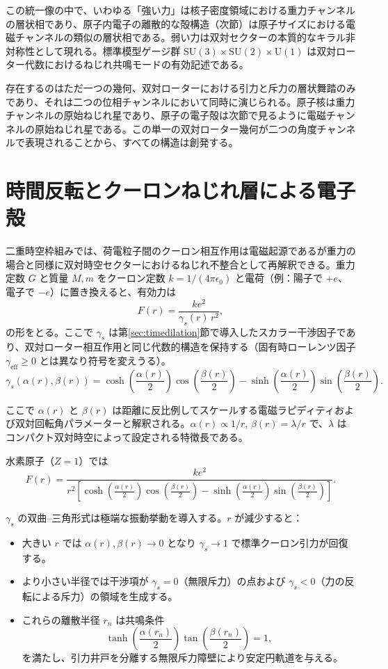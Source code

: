 \documentclass[dvipdfmx,a4paper]{article}
\begin{document}
この統一像の中で、いわゆる「強い力」は核子密度領域における重力チャンネルの層状相であり、原子内電子の離散的な殻構造（次節）は原子サイズにおける電磁チャンネルの類似の層状相である。弱い力は双対セクターの本質的なキラル非対称性として現れる。標準模型ゲージ群 $\mathrm{SU}(3)\times\mathrm{SU}(2)\times\mathrm{U}(1)$ は双対ローター代数におけるねじれ共鳴モードの有効記述である。

存在するのはただ一つの幾何、双対ローターにおける引力と斥力の層状舞踏のみであり、それは二つの位相チャンネルにおいて同時に演じられる。原子核は重力チャンネルの原始ねじれ星であり、原子の電子殻は次節で見るように電磁チャンネルの原始ねじれ星である。この単一の双対ローター幾何が二つの角度チャンネルで表現されることから、すべての構造は創発する。

\section{時間反転とクーロンねじれ層による電子殻}
\label{sec:electronshells}

二重時空枠組みでは、荷電粒子間のクーロン相互作用は電磁起源であるが重力の場合と同様に双対時空セクターにおけるねじれ不整合として再解釈できる。重力定数 $G$ と質量 $M,m$ をクーロン定数 $k = 1/(4\pi\epsilon_0)$ と電荷（例：陽子で $+e$、電子で $-e$）に置き換えると、有効力は
\[
F(r) = \frac{k e^2}{\gamma_s(r)\, r^2},
\]
の形をとる。ここで $\gamma_s$ は第\ref{sec:timedilation}節で導入したスカラー干渉因子であり、双対ローター相互作用と同じ代数的構造を保持する（固有時ローレンツ因子 $\gamma_\text{eff} \geq 0$ とは異なり符号を変えうる）。
\[
\gamma_s(\alpha(r),\beta(r)) = \cosh\!\left(\frac{\alpha(r)}{2}\right) \cos\!\left(\frac{\beta(r)}{2}\right) - \sinh\!\left(\frac{\alpha(r)}{2}\right) \sin\!\left(\frac{\beta(r)}{2}\right).
\]

ここで $\alpha(r)$ と $\beta(r)$ は距離に反比例してスケールする電磁ラピディティおよび双対回転角パラメーターと解釈される。$\alpha(r) \propto 1/r$, $\beta(r) = \lambda / r$ で、$\lambda$ はコンパクト双対時空によって設定される特徴長である。

水素原子（$Z=1$）では
\[
F(r) = \frac{k e^2}{r^2 \left[ \cosh\!\left(\frac{\alpha(r)}{2}\right) \cos\!\left(\frac{\beta(r)}{2}\right) - \sinh\!\left(\frac{\alpha(r)}{2}\right) \sin\!\left(\frac{\beta(r)}{2}\right) \right]}.
\]

$\gamma_s$ の双曲--三角形式は極端な振動挙動を導入する。$r$ が減少すると：

\begin{itemize}
  \item 大きい $r$ では $\alpha(r),\beta(r) \to 0$ となり $\gamma_s \to 1$ で標準クーロン引力が回復する。
  \item より小さい半径では干渉項が $\gamma_s = 0$（無限斥力）の点および $\gamma_s < 0$（力の反転による斥力）の領域を生成する。
  \item これらの離散半径 $r_n$ は共鳴条件
  \[
  \tanh\!\left(\frac{\alpha(r_n)}{2}\right) \tan\!\left(\frac{\beta(r_n)}{2}\right) = 1,
  \]
  を満たし、引力井戸を分離する無限斥力障壁により安定円軌道を与える。
\end{itemize}
\end{document}
